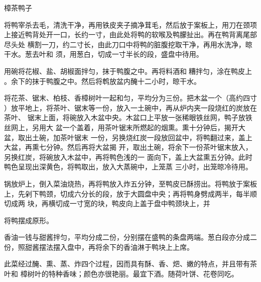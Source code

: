 \begin{recipe}{樟茶鸭子}

\ingredients


\preparation

\step 将鸭宰杀去毛，清洗干净，再用铁皮夹子摘净茸毛，然后放于案板上，用刀在颈项
上接近鸭背处开一口，长约一寸，由此处将鸭的软喉及鸭朦扯出。再在鸭背离尾部尽头处
横割一刀，约二寸长，由此刀口中将鸭的脏腹挖取干净，再用水洗净，晾干水。葱去叶和
须，用葱白，切成一寸半长的段，盛盘中待用。

\step 用碗将花椒、盐、胡椒面拌匀，抹于鸭腹之中。再将料酒和𰪿糟拌匀，涂在鸭皮上
。余下的抹于鸭腹之中。然后将鹎放盆内醃十二小时，晾干水。

\step 将花茶、锯末、柏枝、香樟树叶一起和匀，平均分为三份。把木盆一个（高约四寸
）放平地上，将茶叶、锯末等一份，放入一土碗中，再从炉内夹一段烧红的炭放在茶叶、
锯末上面，将碗放入木盆中央。木盆口上平放一张稀眼铁丝网，鸭子放铁丝网上，另用大
盆一个盖着，用茶叶锯末所燃起的烟熏。熏十分钟后，揭开大盆，取出土碗，加茶叶锯末
一份，另换烧红炭一段放回盆中，将鸭翻过来，盖上大盆，再熏七分钟。然后再将大盆揭
开，取出土碗，将余下一份茶叶锯末放入，另换红炭，将碗放入木盆中，再将鸭色浅的一
面向下，盖上大盆熏五分钟。此时鸭色呈现出深黄色，将鸭取出，放入大蒸碗中，上笼蒸
三小时，出笼晾冷待用。

\step 锅放炉上，倒入菜油烧热，再将鸭放入炸五分钟，至鸭皮已酥捞出。将鸭放于案板
上，先剁下鸭颈，切成六分长的段，放于大圆盘中央；再将鸭身劈成两半，每半顺切成两
块，再横切成一寸宽的块，鸭皮向上盖于盘中鸭颈块上，并

将鸭摆成原形。

\step 香油一钱与甜酱拌匀，平均分成二份，分别摆在盛鸭的条盘两端。葱白段亦分成二
份，照甜酱摆法摆入盘中，再将余下的香油淋于鸭块上上席。

\features

此菜经过醃、熏、蒸、炸四个过程，因而具有酥、香、𤆵、嫩的特点，并且带有茶叶和
樟树叶的特种香味；颜色亦很艳丽。最宜下酒。随荷叶饼、花卷同吃。

\end{recipe}

